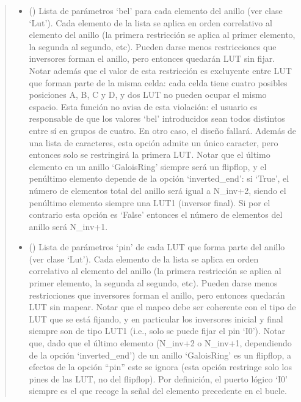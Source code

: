 \documentclass[letterpaper,10pt,english]{sphinxmanual}
\begin{document}
\begin{fulllineitems}
\begin{quote}
\begin{description}
\begin{itemize}
\item {} 
\sphinxAtStartPar
{} () \textendash{} Lista de parámetros ‘bel’ para cada elemento del anillo (ver clase ‘Lut’). Cada elemento de la lista se aplica en orden correlativo al elemento del anillo (la primera restricción se aplica al primer elemento, la segunda al segundo, etc). Pueden darse menos restricciones que inversores forman el anillo, pero entonces quedarán LUT sin fijar. Notar además que el valor de esta restricción es excluyente entre LUT que forman parte de la misma celda: cada celda tiene cuatro posibles posiciones A, B, C y D, y dos LUT no pueden ocupar el mismo espacio. Esta función no avisa de esta violación: el usuario es responsable de que los valores ‘bel’ introducidos sean todos distintos entre sí en grupos de cuatro. En otro caso, el diseño fallará. Además de una lista de caracteres, esta opción admite un único caracter, pero entonces solo se restringirá la primera LUT. Notar que el último elemento en un anillo ‘GaloisRing’ siempre será un flip\sphinxhyphen{}flop, y el penúltimo elemento depende de la opción ‘inverted\_end’: si ‘True’, el número de  elementos total del anillo será igual a N\_inv+2, siendo el penúltimo elemento siempre una LUT1 (inversor final). Si por el contrario esta opción es ‘False’ entonces el número de elementos del anillo será N\_inv+1.

\item {} 
\sphinxAtStartPar
{} () \textendash{} Lista de parámetros ‘pin’ de cada LUT que forma parte del anillo (ver clase ‘Lut’). Cada elemento de la lista se aplica en orden correlativo al elemento del anillo (la primera restricción se aplica al primer elemento, la segunda al segundo, etc). Pueden darse menos restricciones que inversores forman el anillo, pero entonces quedarán LUT sin mapear. Notar que el mapeo debe ser coherente con el tipo de LUT que se está fijando, y en particular los inversores inicial y final siempre son de tipo LUT1 (i.e., solo se puede fijar el pin ‘I0’). Notar que, dado que el último elemento (N\_inv+2 o N\_inv+1, dependiendo de la opción ‘inverted\_end’) de un anillo ‘GaloisRing’ es un flip\sphinxhyphen{}flop, a efectos de la opción “pin” este se ignora (esta opción restringe solo los pines de las LUT, no del flip\sphinxhyphen{}flop). Por definición, el puerto lógico ‘I0’ siempre es el que recoge la señal del elemento precedente en el bucle.


\end{itemize}
\end{description}
\end{quote}
\end{fulllineitems}
\end{document}
